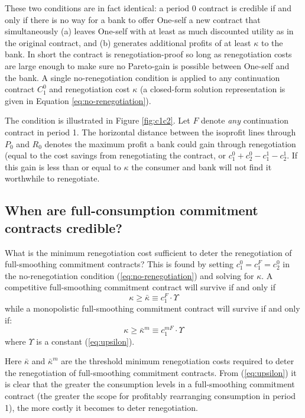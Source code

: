 \documentclass[11pt,english]{article}
\theoremstyle{plain}
\theoremstyle{definition}
\begin{document}
These two conditions are in fact identical: a period 0
contract is credible if and only if there is no way for a bank to
offer One-self a new contract that simultaneously (a) leaves One-self
with at least as much discounted utility as in the original contract,
and (b) generates additional profits of at least $\kappa$ to the
bank. In short the contract is renegotiation-proof so long as renegotiation
costs are large enough to make sure no Pareto-gain is possible between
One-self and the bank. A single no-renegotiation condition
is applied to any continuation contract $C_{1}^{0}$ and
renegotiation cost $\kappa$ (a closed-form solution representation
is given in Equation \ref{eq:no-renegotiation}).

The condition is illustrated in Figure \ref{fig:c1c2}.
Let $F$ denote \textit{any} continuation contract
in period 1. The horizontal distance between the isoprofit lines through
$P_{0}$ and $R_{0}$ denotes the maximum profit a bank could
gain through renegotiation (equal to the cost savings from renegotiating
the contract, or $c_{1}^{0}+c_{2}^{0}-c_{1}^{1}-c_{2}^{1}$. If this
gain is less than or equal to $\kappa$ the consumer and bank will not find it worthwhile to renegotiate.


\subsection{When are full-consumption commitment contracts credible?}

 What is the minimum renegotiation cost sufficient to deter
the renegotiation of full-smoothing commitment contracts? This is
found by setting $c_{1}^{0}=c_{1}^{F}=c_{2}^{0}$ in the
no-renegotiation condition (\ref{eq:no-renegotiation}) and solving for $\kappa$. A competitive
full-smoothing commitment contract will survive if and only if 
\begin{equation}
\kappa\geq\bar{\kappa}\equiv c_{1}^{F}\cdot\Upsilon\label{eq:kbar}
\end{equation}
while a monopolistic full-smoothing commitment contract will survive
if and only if: 
\begin{equation}
\kappa\geq\bar{\kappa}^{m}\equiv c_{1}^{mF}\cdot\Upsilon\label{eq:kbarM}
\end{equation}
where $\Upsilon$ is a constant (\ref{eq:upsilon}).

Here $\bar{\kappa}$ and $\bar{\kappa}^{m}$ are the threshold minimum
renegotiation costs required to deter the renegotiation of full-smoothing commitment
contracts. From (\ref{eq:upsilon}) it is clear that the greater the consumption
levels in a full-smoothing commitment contract (the greater the scope for profitably rearranging
consumption in period 1), the more costly it becomes to deter renegotiation. 
\end{document}
